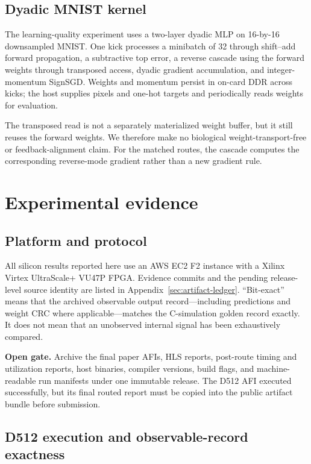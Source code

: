 \documentclass[10pt]{article}
\newcommand{\gate}[1]{\textcolor{orange!55!black}{\textbf{Open gate.} #1}}
\begin{document}
\subsection{Dyadic MNIST kernel}

The learning-quality experiment uses a two-layer dyadic MLP on 16-by-16
downsampled MNIST.  One kick processes a minibatch of 32 through shift--add
forward propagation, a subtractive top error, a reverse cascade using the
forward weights through transposed access, dyadic gradient accumulation, and
integer-momentum SignSGD.  Weights and momentum persist in on-card DDR across
kicks; the host supplies pixels and one-hot targets and periodically reads
weights for evaluation.

The transposed read is not a separately materialized weight buffer, but it
still reuses the forward weights.  We therefore make no biological
weight-transport-free or feedback-alignment claim.  For the matched routes,
the cascade computes the corresponding reverse-mode gradient rather than a
new gradient rule.

\section{Experimental evidence}

\subsection{Platform and protocol}

All silicon results reported here use an AWS EC2 F2 instance with a Xilinx
Virtex UltraScale+ VU47P FPGA.  Evidence commits and the pending release-level
source identity are listed in Appendix~\ref{sec:artifact-ledger}.  ``Bit-exact'' means
that the archived observable output record---including predictions and weight
CRC where applicable---matches the C-simulation golden record exactly.  It
does not mean that an unobserved internal signal has been exhaustively compared.

\gate{Archive the final paper AFIs, HLS reports, post-route timing and
utilization reports, host binaries, compiler versions, build flags, and
machine-readable run manifests under one immutable release.  The D512 AFI
executed successfully, but its final routed report must be copied into the
public artifact bundle before submission.}

\subsection{D512 execution and observable-record exactness}
\end{document}
